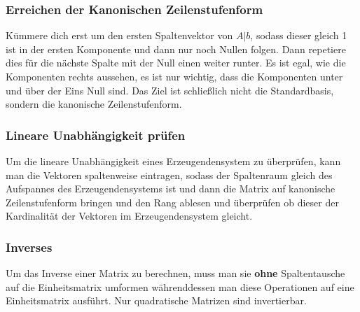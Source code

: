 \documentclass{article}
\begin{document}
\subsubsection*{Erreichen der Kanonischen Zeilenstufenform}
Kümmere dich erst um den ersten Spaltenvektor von \(A|b\), sodass dieser gleich 1 ist in der ersten Komponente und dann nur noch Nullen folgen. Dann repetiere dies für die nächste Spalte mit der Null einen weiter runter. Es ist egal, wie die Komponenten rechts aussehen, es ist nur wichtig, dass die Komponenten unter und über der Eins Null sind. Das Ziel ist schließlich nicht die Standardbasis, sondern die kanonische Zeilenstufenform.
\subsubsection*{Lineare Unabhängigkeit prüfen}
Um die lineare Unabhängigkeit eines Erzeugendensystem zu überprüfen, kann man die Vektoren spaltenweise eintragen, sodass der Spaltenraum gleich des Aufspannes des Erzeugendensystems ist und dann die Matrix auf kanonische Zeilenstufenform bringen und den Rang ablesen und überprüfen ob dieser der Kardinalität der Vektoren im Erzeugendensystem gleicht.
\subsubsection*{Inverses}
Um das Inverse einer Matrix zu berechnen, muss man sie \textbf{ohne} Spaltentausche auf die Einheitsmatrix umformen währenddessen man diese Operationen auf eine Einheitsmatrix ausführt. Nur quadratische Matrizen sind invertierbar.
\end{document}
